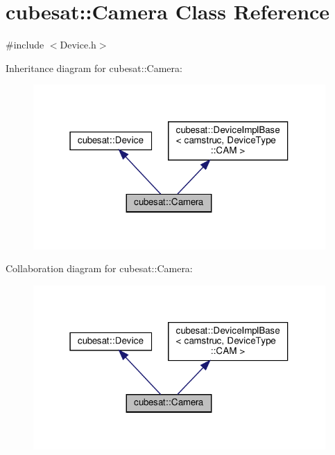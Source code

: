 \hypertarget{classcubesat_1_1Camera}{}\section{cubesat\+:\+:Camera Class Reference}
\label{classcubesat_1_1Camera}


{\ttfamily \#include $<$Device.\+h$>$}



Inheritance diagram for cubesat\+:\+:Camera\+:
\nopagebreak
\begin{figure}[H]
\begin{center}
\leavevmode
\includegraphics[width=316pt]{classcubesat_1_1Camera__inherit__graph}
\end{center}
\end{figure}


Collaboration diagram for cubesat\+:\+:Camera\+:
\nopagebreak
\begin{figure}[H]
\begin{center}
\leavevmode
\includegraphics[width=316pt]{classcubesat_1_1Camera__coll__graph}
\end{center}
\end{figure}
